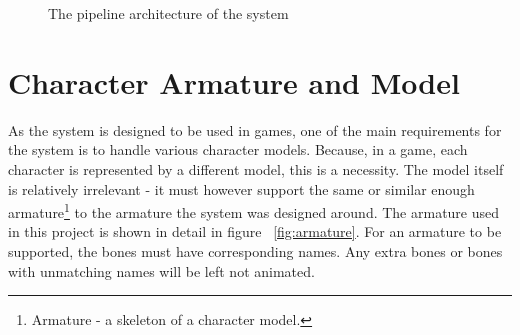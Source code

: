 \begin{figure}[!ht]
\centerline{}
\caption{The pipeline architecture of the system}\label{fig:architecture}
\end{figure}

\section{Character Armature and Model}

As the system is designed to be used in games, one of the main requirements for the system is to handle various character models. Because, in a game, each character is represented by a different model, this is a necessity. The model itself is relatively irrelevant - it must however support the same or similar enough armature\footnote{Armature - a skeleton of a character model.} to the armature the system was designed around. The armature used in this project is shown in detail in figure ~\ref{fig:armature}. For an armature to be supported, the bones must have corresponding names. Any extra bones or bones with unmatching names will be left not animated.

